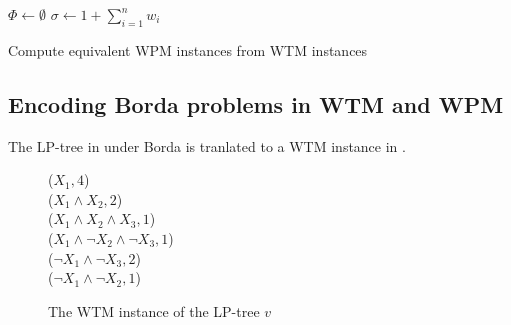 \begin{algorithm}[ht]
	$\Phi \leftarrow \emptyset$\;
	$\sigma \leftarrow 1+\sum^n_{i=1} w_i$\;
\Return{$\Phi$}
\caption{Compute equivalent WPM instances from WTM instances}
\label{alg:wtm_wpm}
\end{algorithm}


\subsection{Encoding Borda problems in WTM and WPM}
The LP-tree in  under Borda is tranlated to a WTM instance
in .
\begin{figure}[ht]
   \small
	\begin{framed}
		($X_1,4$)\\
		($X_1 \wedge X_2, 2$)\\
		($X_1 \wedge X_2 \wedge X_3, 1$)\\
		($X_1 \wedge \neg X_2 \wedge \neg X_3, 1$)\\
		($\neg X_1 \wedge \neg X_3, 2$)\\
		($\neg X_1 \wedge \neg X_2, 1$)
	\end{framed}
	\caption{The WTM instance of the LP-tree $v$}
  \label{fig:borda_wtm}
\end{figure}


